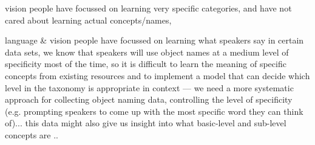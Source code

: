 
 vision people have focussed on learning very specific categories, and have not cared about learning actual concepts/names, 
 
 language \& vision people have focussed on learning what speakers say in certain data sets, 
 we know that speakers will use object names at a medium level of specificity most of the time, 
 so it is difficult to learn the meaning of specific concepts from existing resources and to implement a model that can decide which level in the taxonomy is appropriate in context --- 
 we need a more systematic approach for collecting object naming data, 
 controlling the level of specificity (e.g. prompting speakers to come up with the most specific word they can think of)... this data might also give us insight into what basic-level and sub-level concepts are ..